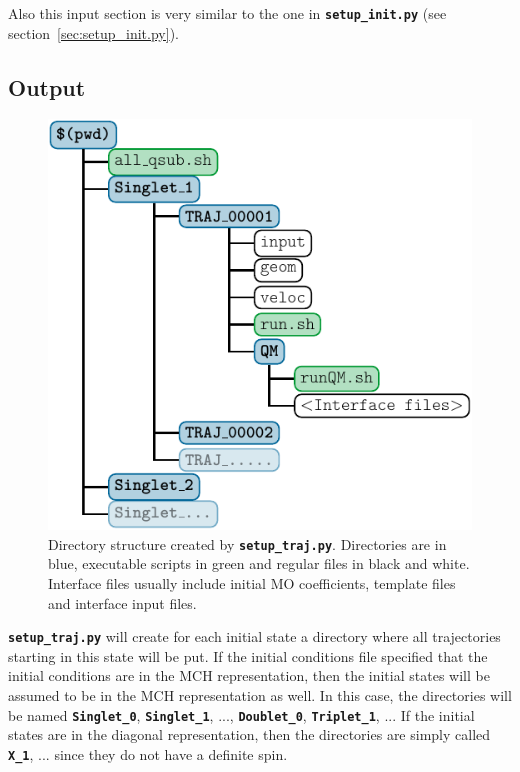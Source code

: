 \documentclass[a4paper,11pt,DIV=15,openany,twoside=false]{scrbook}
\newcommand{\ttt}[1]{\textbf{\texttt{#1}}}
\begin{document}
Also this input section is very similar to the one in \ttt{setup\_init.py} (see section~\ref{sec:setup_init.py}).

\subsection{Output}

\begin{figure}
  \centering
  \includegraphics[scale=1]{img/dirs_traj/dirs_traj.pdf}
  \caption{Directory structure created by \ttt{setup\_traj.py}. Directories are in blue, executable scripts in green and regular files in black and white. Interface files usually include initial MO coefficients, template files and interface input files.}
  \label{fig:dirs_traj}
\end{figure}

\ttt{setup\_traj.py} will create for each initial state a directory where all trajectories starting in this state will be put. If the initial conditions file specified that the initial conditions are in the MCH representation, then the initial states will be assumed to be in the MCH representation as well. In this case, the directories will be named \ttt{Singlet\_0}, \ttt{Singlet\_1}, ..., \ttt{Doublet\_0}, \ttt{Triplet\_1}, ... If the initial states are in the diagonal representation, then the directories are simply called \ttt{X\_1}, ... since they do not have a definite spin.
\end{document}
